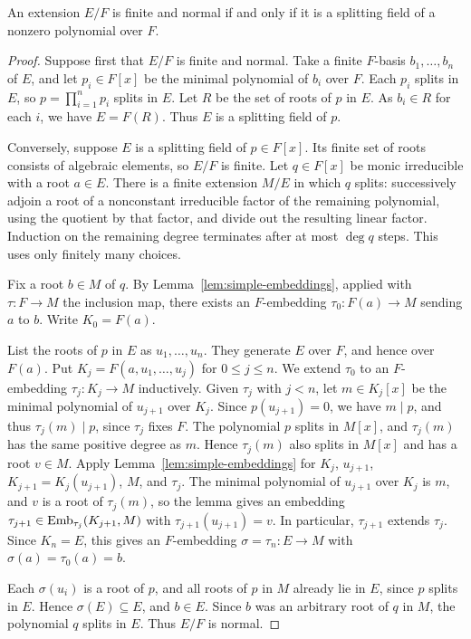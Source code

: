 \begin{lemma}\label{lem:splitting-normal}
An extension $E/F$ is finite and normal if and only if it is a
splitting field of a nonzero polynomial over $F$.
\end{lemma}

\begin{proof}
Suppose first that $E/F$ is finite and normal. Take a finite
$F$-basis $b_1,\ldots,b_n$ of $E$, and let $p_i\in F[x]$ be the
minimal polynomial of $b_i$ over $F$. Each $p_i$ splits in $E$,
so $p=\prod_{i=1}^n p_i$ splits in $E$. Let $R$ be the set of roots
of $p$ in $E$.
As $b_i\in R$ for each $i$, we have $E=F(R)$. Thus $E$ is a splitting
field of $p$.

Conversely, suppose $E$ is a splitting field of $p\in F[x]$.
Its finite set of roots consists of algebraic elements, so $E/F$
is finite. Let $q\in F[x]$ be monic irreducible with a root $a\in E$.
There is a finite extension $M/E$ in which $q$ splits: successively
adjoin a root of a nonconstant irreducible factor of the remaining
polynomial, using the quotient by that factor, and divide out the
resulting linear factor. Induction on the remaining degree terminates
after at most $\deg q$ steps. This uses only finitely many choices.

Fix a root $b\in M$ of $q$. By Lemma~\ref{lem:simple-embeddings}, applied
with $\tau:F\to M$ the inclusion map,
there exists an $F$-embedding $\tau_0:F(a)\to M$ sending $a$ to $b$.
Write $K_0=F(a)$.

List the roots of $p$ in $E$ as $u_1,\ldots,u_n$.
They generate $E$ over $F$, and hence over $F(a)$.
Put $K_j=F(a,u_1,\ldots,u_j)$ for $0\le j\le n$.
We extend $\tau_0$ to an $F$-embedding $\tau_j:K_j\to M$ inductively.
Given $\tau_j$ with $j<n$, let $m\in K_j[x]$ be the minimal
polynomial of $u_{j+1}$ over $K_j$. Since $p(u_{j+1})=0$,
we have $m\mid p$, and thus $\tau_j(m)\mid p$, since $\tau_j$ fixes $F$.
The polynomial $p$ splits in $M[x]$, and $\tau_j(m)$ has the same
positive degree as $m$. Hence $\tau_j(m)$ also splits in $M[x]$
and has a root $v\in M$. Apply Lemma~\ref{lem:simple-embeddings} for
$K_j$, $u_{j+1}$, $K_{j+1}=K_j(u_{j+1})$, $M$, and
$\tau_j$. The minimal polynomial of $u_{j+1}$ over $K_j$ is $m$, and
$v$ is a root of $\tau_j(m)$, so the lemma gives an embedding
$\tau_{j+1}\in\operatorname{Emb}_{\tau_j}(K_{j+1},M)$ with
$\tau_{j+1}(u_{j+1})=v$. In particular, $\tau_{j+1}$ extends $\tau_j$.
Since $K_n=E$, this gives an $F$-embedding $\sigma=\tau_n:E\to M$
with $\sigma(a)=\tau_{0}(a)=b$.

Each $\sigma(u_i)$ is a root of $p$, and all roots of $p$ in $M$
already lie in $E$, since $p$ splits in $E$.
Hence $\sigma(E)\subseteq E$, and $b\in E$.
Since $b$ was an arbitrary root of $q$ in $M$, the polynomial $q$
splits in $E$. Thus $E/F$ is normal.
\end{proof}

